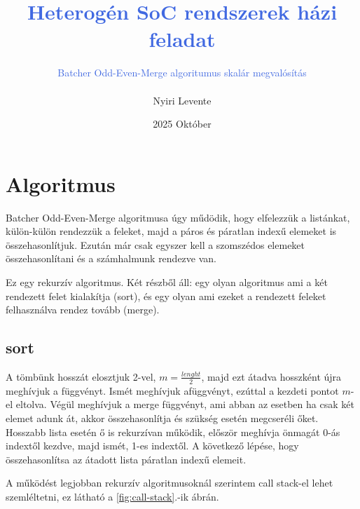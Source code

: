 \documentclass[12pt, letterpaper, a4paper]{article}
\title{\textcolor{RoyalBlue}{\textbf{Heterogén SoC rendszerek házi feladat}}}
\author{\textcolor{RoyalBlue}{Batcher Odd-Even-Merge algoritumus skalár megvalósítás} \\ \\ Nyiri Levente}
\date{2025 Október}
\begin{document}
\maketitle

\newpage

\section{Algoritmus}

Batcher Odd-Even-Merge algoritmusa úgy műdödik, hogy elfelezzük a listánkat, külön-külön rendezzük a feleket, majd a páros és páratlan indexű elemeket is összehasonlítjuk. Ezután már csak egyszer kell a szomszédos elemeket összehasonlítani és a számhalmunk rendezve van.

Ez egy rekurzív algoritmus. Két részből áll: egy olyan algoritmus ami a két rendezett felet kialakítja (sort), és egy olyan ami ezeket a rendezett feleket felhasználva rendez tovább (merge).

\subsection{sort}

A tömbünk hosszát elosztjuk 2-vel, \( m = \frac{lenght}{2} \), majd ezt átadva hosszként újra meghívjuk a függvényt. Ismét meghívjuk afüggvényt, ezúttal a kezdeti pontot \(m\)-el eltolva. Végül meghívjuk a merge függvényt, ami abban az esetben ha csak két elemet adunk át, akkor összehasonlítja és szükség esetén megcseréli őket. Hosszabb lista esetén ő is rekurzívan működik, először meghívja önmagát 0-ás indextől kezdve, majd ismét, 1-es indextől. A következő lépése, hogy összehasonlítsa az átadott lista páratlan indexű elemeit.

A működést legjobban rekurzív algoritmusoknál szerintem call stack-el lehet szemléltetni, ez látható a \ref{fig:call-stack}.-ik ábrán.


\end{document}
